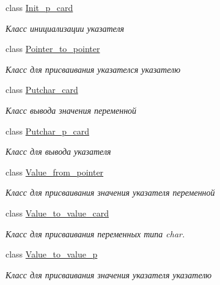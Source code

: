 \begin{DoxyCompactItemize}
class \mbox{\hyperlink{classcards_1_1_init__p__card}{Init\+\_\+p\+\_\+card}}
\begin{DoxyCompactList}\small\item\em Класс инициализации указателя \end{DoxyCompactList}\item 
class \mbox{\hyperlink{classcards_1_1_pointer__to__pointer}{Pointer\+\_\+to\+\_\+pointer}}
\begin{DoxyCompactList}\small\item\em Класс для присваивания указателся указателю \end{DoxyCompactList}\item 
class \mbox{\hyperlink{classcards_1_1_putchar__card}{Putchar\+\_\+card}}
\begin{DoxyCompactList}\small\item\em Класс вывода значения переменной \end{DoxyCompactList}\item 
class \mbox{\hyperlink{classcards_1_1_putchar__p__card}{Putchar\+\_\+p\+\_\+card}}
\begin{DoxyCompactList}\small\item\em Класс для вывода указателя \end{DoxyCompactList}\item 
class \mbox{\hyperlink{classcards_1_1_value__from__pointer}{Value\+\_\+from\+\_\+pointer}}
\begin{DoxyCompactList}\small\item\em Класс для присваивания значения указателя переменной \end{DoxyCompactList}\item 
class \mbox{\hyperlink{classcards_1_1_value__to__value__card}{Value\+\_\+to\+\_\+value\+\_\+card}}
\begin{DoxyCompactList}\small\item\em Класс для присваивания переменных типа char. \end{DoxyCompactList}\item 
class \mbox{\hyperlink{classcards_1_1_value__to__value__p}{Value\+\_\+to\+\_\+value\+\_\+p}}
\begin{DoxyCompactList}\small\item\em Класс для присваивания значения указателя указателю \end{DoxyCompactList}\end{DoxyCompactItemize}
